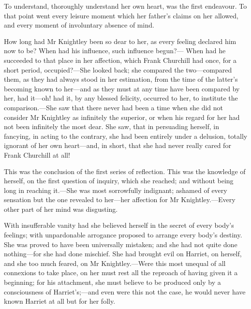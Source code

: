 To understand, thoroughly understand her own heart, was the first endeavour. To that point went every leisure moment which her father's claims on her allowed, and every moment of involuntary absence of mind.

How long had Mr Knightley been so dear to her, as every feeling declared him now to be? When had his influence, such influence begun?— When had he succeeded to that place in her affection, which Frank Churchill had once, for a short period, occupied?—She looked back; she compared the two—compared them, as they had always stood in her estimation, from the time of the latter's becoming known to her—and as they must at any time have been compared by her, had it—oh! had it, by any blessed felicity, occurred to her, to institute the comparison.—She saw that there never had been a time when she did not consider Mr Knightley as infinitely the superior, or when his regard for her had not been infinitely the most dear. She saw, that in persuading herself, in fancying, in acting to the contrary, she had been entirely under a delusion, totally ignorant of her own heart—and, in short, that she had never really cared for Frank Churchill at all!

This was the conclusion of the first series of reflection. This was the knowledge of herself, on the first question of inquiry, which she reached; and without being long in reaching it.—She was most sorrowfully indignant; ashamed of every sensation but the one revealed to her—her affection for Mr Knightley.—Every other part of her mind was disgusting.

With insufferable vanity had she believed herself in the secret of every body's feelings; with unpardonable arrogance proposed to arrange every body's destiny. She was proved to have been universally mistaken; and she had not quite done nothing—for she had done mischief. She had brought evil on Harriet, on herself, and she too much feared, on Mr Knightley.—Were this most unequal of all connexions to take place, on her must rest all the reproach of having given it a beginning; for his attachment, she must believe to be produced only by a consciousness of Harriet's;—and even were this not the case, he would never have known Harriet at all but for her folly.

